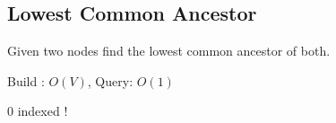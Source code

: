 \subsection{Lowest Common Ancestor}

Given two nodes find the lowest common ancestor of both.

Build : $O(V)$, Query: $O(1)$

{\color{red} 0 indexed !}

